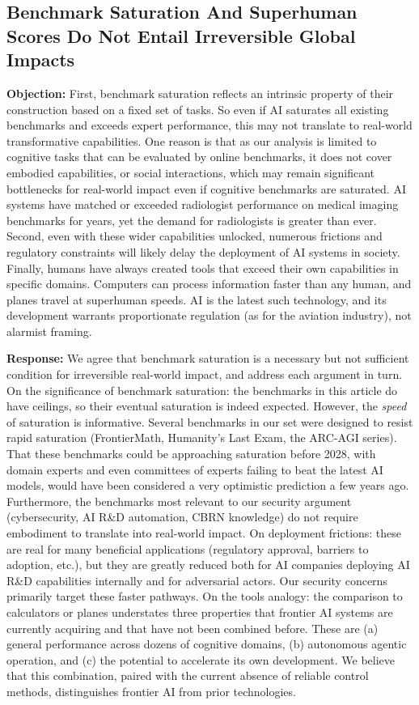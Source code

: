 \documentclass[letterpaper,twocolumn]{article}
\newcommand{\revised}[1]{#1}
\begin{document}
\revised{\subsection{Benchmark Saturation And Superhuman Scores Do Not Entail Irreversible Global Impacts}
\label{subsec:alt_realworld}

\textbf{Objection:} First, benchmark saturation reflects an intrinsic property of their construction based on a fixed set of tasks. So even if AI saturates all existing benchmarks and exceeds expert performance, this may not translate to real-world transformative capabilities. One reason is that as our analysis is limited to cognitive tasks that can be evaluated by online benchmarks, it does not cover embodied capabilities, or social interactions, which may remain significant bottlenecks for real-world impact even if cognitive benchmarks are saturated. AI systems have matched or exceeded radiologist performance on medical imaging benchmarks for years, yet the demand for radiologists is greater than ever. 
Second, even with these wider capabilities unlocked, numerous frictions and regulatory constraints will likely delay the deployment of AI systems in society.
Finally, humans have always created tools that exceed their own capabilities in specific domains. Computers can process information faster than any human, and planes travel at superhuman speeds. AI is the latest such technology, and its development warrants proportionate regulation (as for the aviation industry), not alarmist framing.

\textbf{Response:} We agree that benchmark saturation is a necessary but not sufficient condition for irreversible real-world impact, and address each argument in turn.
On the significance of benchmark saturation: the benchmarks in this article do have ceilings, so their eventual saturation is indeed expected. However, the \emph{speed} of saturation is informative. Several benchmarks in our set were designed to resist rapid saturation (FrontierMath, Humanity's Last Exam, the ARC-AGI series). That these benchmarks could be approaching saturation before 2028, with domain experts and even committees of experts failing to beat the latest AI models, would have been considered a very optimistic prediction a few years ago. Furthermore, the benchmarks most relevant to our security argument (cybersecurity, AI R\&D automation, CBRN knowledge) do not require embodiment to translate into real-world impact.
On deployment frictions: these are real for many beneficial applications (regulatory approval, barriers to adoption, etc.), but they are greatly reduced both for AI companies deploying AI R\&D capabilities internally and for adversarial actors. Our security concerns primarily target these faster pathways.
On the tools analogy: the comparison to calculators or planes understates three properties that frontier AI systems are currently acquiring and that have not been combined before. These are (a) general performance across dozens of cognitive domains, (b) autonomous agentic operation, and (c) the potential to accelerate its own development. We believe that this combination, paired with the current absence of reliable control methods, distinguishes frontier AI from prior technologies.

}
\end{document}
